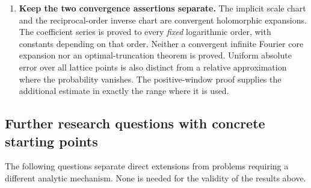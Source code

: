 \begin{enumerate}[label=\textbf{A\arabic*.},leftmargin=*]
\item \textbf{Keep the two convergence assertions separate.}
The implicit scale chart and the reciprocal-order inverse chart
are convergent holomorphic expansions. The coefficient series
is proved to every \emph{fixed} logarithmic order, with constants
depending on that order. Neither a convergent infinite Fourier
core expansion nor an optimal-truncation theorem is proved.
Uniform absolute error over all lattice points is also distinct
from a relative approximation where the probability vanishes.
The positive-window proof supplies the additional estimate in
exactly the range where it is used.
\end{enumerate}

\subsection{Further research questions with concrete starting points}

The following questions separate direct extensions from problems
requiring a different analytic mechanism. None is needed for the
validity of the results above.

